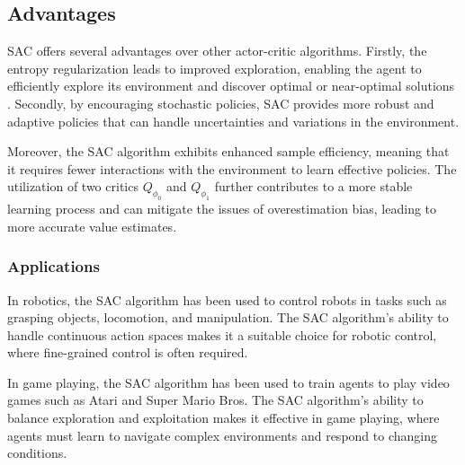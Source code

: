 
\subsection{Advantages}

SAC offers several advantages over other actor-critic algorithms. Firstly, the entropy regularization leads to improved exploration, enabling the agent to efficiently explore its environment and discover optimal or near-optimal solutions . Secondly, by encouraging stochastic policies, SAC provides more robust and adaptive policies that can handle uncertainties and variations in the environment.

Moreover, the SAC algorithm exhibits enhanced sample efficiency, meaning that it requires fewer interactions with the environment to learn effective policies. The utilization of two critics $Q_{\phi_0}$ and $Q_{\phi_1}$ further contributes to a more stable learning process and can mitigate the issues of overestimation bias, leading to more accurate value estimates. 

\subsubsection{Applications}


In robotics, the SAC algorithm has been used to control robots in tasks such as grasping objects, locomotion, and manipulation. The SAC algorithm's ability to handle continuous action spaces makes it a suitable choice for robotic control, where fine-grained control is often required. 

In game playing, the SAC algorithm has been used to train agents to play video games such as Atari and Super Mario Bros.  The SAC algorithm's ability to balance exploration and exploitation makes it effective in game playing, where agents must learn to navigate complex environments and respond to changing conditions.

% 

